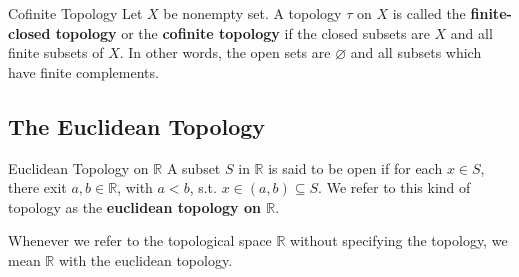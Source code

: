 \begin{definition}{Cofinite Topology}{}
    Let $X$ be nonempty set. A topology $\tau$ on $X$ is called the
    \textbf{finite-closed topology} or the \textbf{cofinite topology}
    if the closed subsets are $X$ and all finite subsets of $X$. In
    other words, the open sets are $\varnothing$ and all subsets which
    have finite complements.
\end{definition}

\subsection{The Euclidean Topology}\label{sub:The Euclidean Topology} %

\begin{definition}{Euclidean Topology on $\mathbb{R}$}{}
    A subset $S$ in $\mathbb{R}$ is said to be open if for each $x
    \in S$, there exit $a,b \in \mathbb{R}$, with $a < b$, s.t. $x
    \in (a,b) \subseteq S$. We refer to this kind of topology as the
    \textbf{euclidean topology on $\mathbb{R}$}.
\end{definition}

\begin{remarks}
    Whenever we refer to the topological space $\mathbb{R}$ without
    specifying the
    topology, we mean $\mathbb{R}$ with the euclidean topology.
\end{remarks}
